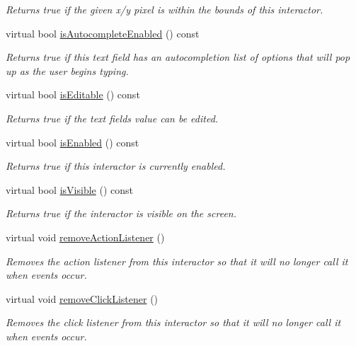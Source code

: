 \begin{DoxyCompactItemize}
\begin{DoxyCompactList}\small\item\em Returns true if the given x/y pixel is within the bounds of this interactor. \end{DoxyCompactList}\item 
virtual bool \mbox{\hyperlink{classGTextField_a7528cfb0542ac5268efe1d7362b89344}{is\+Autocomplete\+Enabled}} () const
\begin{DoxyCompactList}\small\item\em Returns true if this text field has an autocompletion list of options that will pop up as the user begins typing. \end{DoxyCompactList}\item 
virtual bool \mbox{\hyperlink{classGTextField_a012b5afb54e037e6c5498cf0932a521b}{is\+Editable}} () const
\begin{DoxyCompactList}\small\item\em Returns true if the text field\textquotesingle{}s value can be edited. \end{DoxyCompactList}\item 
virtual bool \mbox{\hyperlink{classGInteractor_aacb819fb241851fd9fc045271baa4034}{is\+Enabled}} () const
\begin{DoxyCompactList}\small\item\em Returns true if this interactor is currently enabled. \end{DoxyCompactList}\item 
virtual bool \mbox{\hyperlink{classGInteractor_a9d8a6cfb13917785c143e74d40e4e2be}{is\+Visible}} () const
\begin{DoxyCompactList}\small\item\em Returns true if the interactor is visible on the screen. \end{DoxyCompactList}\item 
virtual void \mbox{\hyperlink{classGInteractor_ab7fe7a876367b87cf7202f947f1d05e4}{remove\+Action\+Listener}} ()
\begin{DoxyCompactList}\small\item\em Removes the action listener from this interactor so that it will no longer call it when events occur. \end{DoxyCompactList}\item 
virtual void \mbox{\hyperlink{classGInteractor_ad39d0325cde6b97ebda4b9d7787c633b}{remove\+Click\+Listener}} ()
\begin{DoxyCompactList}\small\item\em Removes the click listener from this interactor so that it will no longer call it when events occur. \end{DoxyCompactList}\item 

\end{DoxyCompactItemize}
